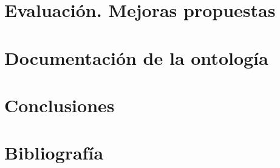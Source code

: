 \documentclass[a4paper,12pt]{article}
\begin{document}
	\section{Evaluación. Mejoras propuestas}
	
	\section{Documentación de la ontología}
	
	\section{Conclusiones}
	
	
\newpage
	\section*{Bibliografía}
	
	
\end{document}

